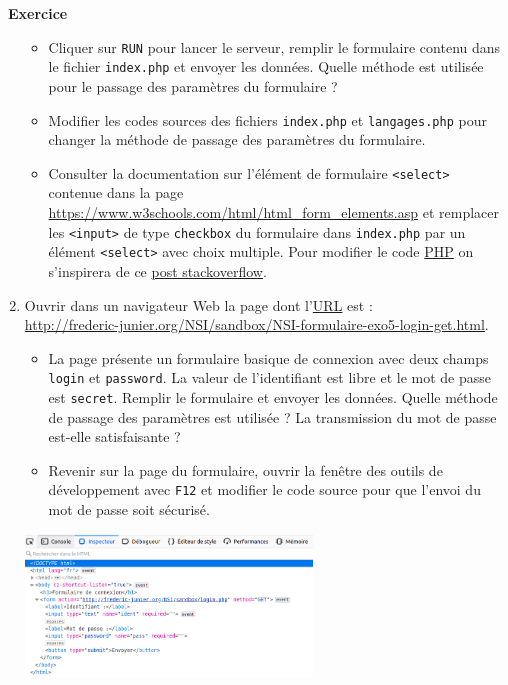 \documentclass[
  11pt,
]{article}
\newcommand{\passthrough}[1]{#1}
\providecommand{\tightlist}{%
  \setlength{\itemsep}{0pt}\setlength{\parskip}{0pt}}
\newcounter{exo}
\newenvironment{exercice}[1]
{\par \medskip   \addtocounter{exo}{1} \noindent  
\begin{bclogo}[arrondi =0.1,   noborder = true, logo=\bccrayon, marge=4]{~\textbf{Exercice} \textbf{\theexo} {\itshape #1} }  \par}
{
\end{bclogo}
 \par \bigskip }
\newcounter{logi}
\begin{document}
\begin{exercice}{}
\begin{enumerate}
  \begin{itemize}
  \tightlist
  \item
    Cliquer sur \passthrough{\lstinline!RUN!} pour lancer le serveur,
    remplir le formulaire contenu dans le fichier
    \passthrough{\lstinline!index.php!} et envoyer les données. Quelle
    méthode est utilisée pour le passage des paramètres du formulaire ?
  \item
    Modifier les codes sources des fichiers
    \passthrough{\lstinline!index.php!} et
    \passthrough{\lstinline!langages.php!} pour changer la méthode de
    passage des paramètres du formulaire.
  \item
    Consulter la documentation sur l'élément de formulaire
    \passthrough{\lstinline!<select>!} contenue dans la page
    \url{https://www.w3schools.com/html/html_form_elements.asp} et
    remplacer les \passthrough{\lstinline!<input>!} de type
    \passthrough{\lstinline!checkbox!} du formulaire dans
    \passthrough{\lstinline!index.php!} par un élément
    \passthrough{\lstinline!<select>!} avec choix multiple. Pour
    modifier le code \url{PHP} on s'inspirera de ce
    \href{https://stackoverflow.com/questions/2407284/how-to-get-multiple-selected-values-of-select-box-in-php/2407401\#2407401}{post
    stackoverflow}.
  \end{itemize}
\item
  Ouvrir dans un navigateur Web la page dont
  l'\href{https://developer.mozilla.org/fr/docs/Glossaire/URL}{URL} est
  :\\
  \url{http://frederic-junier.org/NSI/sandbox/NSI-formulaire-exo5-login-get.html}.

  \begin{itemize}
  \tightlist
  \item
    La page présente un formulaire basique de connexion avec deux champs
    \passthrough{\lstinline!login!} et
    \passthrough{\lstinline!password!}. La valeur de l'identifiant est
    libre et le mot de passe est \passthrough{\lstinline!secret!}.
    Remplir le formulaire et envoyer les données. Quelle méthode de
    passage des paramètres est utilisée ? La transmission du mot de
    passe est-elle satisfaisante ?
  \item
    Revenir sur la page du formulaire, ouvrir la fenêtre des outils de
    développement avec \passthrough{\lstinline!F12!} et modifier le code
    source pour que l'envoi du mot de passe soit sécurisé.
  \end{itemize}

  \includegraphics[width=0.6\textwidth,height=\textheight]{images/login.png}\\


\end{enumerate}
\end{exercice}
\end{document}
